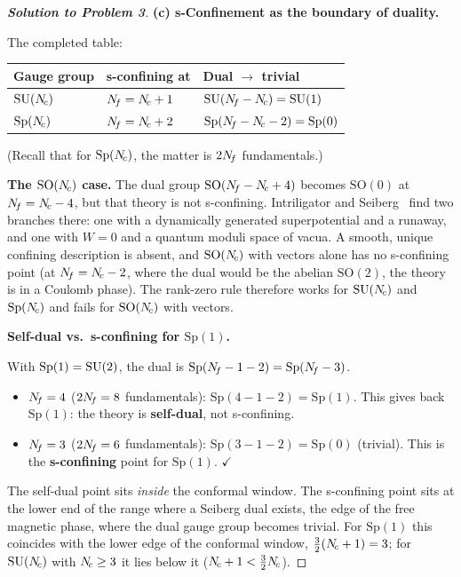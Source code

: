 \documentclass[11pt,a4paper]{article}
\newcommand{\SO}[1]{\mathrm{SO}(#1)}
\newcommand{\Sp}[1]{\mathrm{Sp}(#1)}
\begin{document}
\begin{proof}[\textbf{Solution to Problem 3}]
\textbf{(c) s-Confinement as the boundary of duality.}

The completed table:

\renewcommand{\arraystretch}{1.3}
\begin{center}
\begin{tabular}{@{}l l l@{}}
\toprule
\textbf{Gauge group} & \textbf{s-confining at} &
  \textbf{Dual $\to$ trivial} \\
\midrule
$\mathrm{SU}(N_{\!c})$ & $N_{\!f} = N_{\!c} + 1$ &
  $\mathrm{SU}(N_{\!f} - N_{\!c}) = \mathrm{SU}(1)$ \\
$\Sp{\Nc}$ & $N_{\!f} = N_{\!c} + 2$ &
  $\Sp{\Nf - \Nc - 2} = \Sp{0}$ \\
\bottomrule
\end{tabular}
\end{center}

(Recall that for $\Sp{\Nc}$, the matter is $2N_{\!f}$ fundamentals.)

\textbf{The $\SO{\Nc}$ case.}  The dual group $\SO{\Nf - \Nc + 4}$
becomes $\SO{0}$ at $N_{\!f} = N_{\!c} - 4$, but that theory is not
s-confining.  Intriligator and Seiberg~\cite{IS9506101} find two
branches there: one with a dynamically generated superpotential and a
runaway, and one with $W = 0$ and a quantum moduli space of vacua.  A
smooth, unique confining description is absent, and $\SO{\Nc}$ with
vectors alone has no s-confining point (at $N_{\!f} = N_{\!c} - 2$, where the
dual would be the abelian $\SO{2}$, the theory is in a Coulomb phase).
The rank-zero rule therefore works for $\mathrm{SU}(N_{\!c})$ and $\Sp{\Nc}$ and
fails for $\SO{\Nc}$ with vectors.

\textbf{Self-dual vs.\ s-confining for $\Sp{1}$.}

With $\Sp{1} = \SU{2}$, the dual is $\Sp{\Nf - 1 - 2} = \Sp{\Nf - 3}$.

\begin{itemize}
  \item $N_{\!f} = 4$ ($2N_{\!f} = 8$ fundamentals):
    $\Sp{4 - 1 - 2} = \Sp{1}$.  This gives back $\Sp{1}$: the theory
    is \textbf{self-dual}, not s-confining.

  \item $N_{\!f} = 3$ ($2N_{\!f} = 6$ fundamentals):
    $\Sp{3 - 1 - 2} = \Sp{0}$ (trivial).  This is the
    \textbf{s-confining} point for $\Sp{1}$.
    \quad$\checkmark$
\end{itemize}

The self-dual point sits \emph{inside} the conformal window.  The
s-confining point sits at the lower end of the range where a Seiberg
dual exists, the edge of the free magnetic phase, where the dual gauge
group becomes trivial.  For $\Sp{1}$ this coincides with the lower edge
of the conformal window, $\tfrac{3}{2}(N_{\!c} + 1) = 3$; for $\mathrm{SU}(N_{\!c})$
with $N_{\!c} \geq 3$ it lies below it ($N_{\!c} + 1 < \tfrac{3}{2}N_{\!c}$).

\end{proof}
\end{document}
